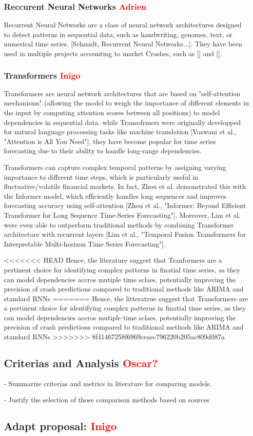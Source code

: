 \documentclass[12pt, letterpaper]{article}
\begin{document}
    \subsubsection*{Reccurent Neural Networks \textcolor{red}{Adrien}}
    Recurrent Neural Networks are a class of neural network architectures designed to detect patterns in sequential data, such as handwriting, genomes, text, or numerical time series. [Schmidt, Recurrent Neural Networks...]. They have been used in multiple projects accounting to market Crashes, such as [] and [].

    \subsubsection*{Transformers \textcolor{red}{Inigo}}
Transformers are neural network architectures that are based on "self-attention mechanisms" (allowing the model to weigh the importance of different elements in the input by computing attention scores between all positions) to model dependencies in sequential data. while Transofrmers were originally developped for natural language processing tasks like machine translation [Vaswani et al., "Attention is All You Need"], they have become popular for time series forecasting due to their ability to handle long-range dependencies.

Transformers can capture complex temporal patterns by assigning varying importance to different time steps, which is particularly useful in fluctuative/volatile financial markets. In fact, Zhou et al. demonstrated this with the Informer model, which efficiently handles long sequences and improves forecasting accuracy using self-attention [Zhou et al., "Informer: Beyond Efficient Transformer for Long Sequence Time-Series Forecasting"]. Moreover, Lim et al. were even able to outperform traditional methods by combining Transformer architecture with recurrent layers [Lim et al., "Temporal Fusion Transformers for Interpretable Multi-horizon Time Series Forecasting"].

<<<<<<< HEAD
Hence, the literature suggest that Tranformers are a pertinent choice for identifying complex patterns in finatial time series, as they can model dependencies accros mutiple time sclaes, potentially improving the precision of crash predictions compared to traditional methods like ARIMA and standard RNNs
=======
Hence, the litteratrue suggest that Transformers are a pertinent choice for identifying complex patterns in finatial time series, as they can model dependencies accros mutiple time sclaes, potentially improving the precision of crash predictions compared to traditional methods like ARIMA and standard RNNs
>>>>>>> 8f41467258f6969ceaec796220b205ac809d087a



\subsection*{Criterias and Analysis \textcolor{red}{Oscar?}}
- Summarize criterias and metrics in literature for comparing models.

- Justify the selection of those comparison methods based on sources



\subsection*{Adapt proposal: \textcolor{red}{Inigo}}
\end{document}
